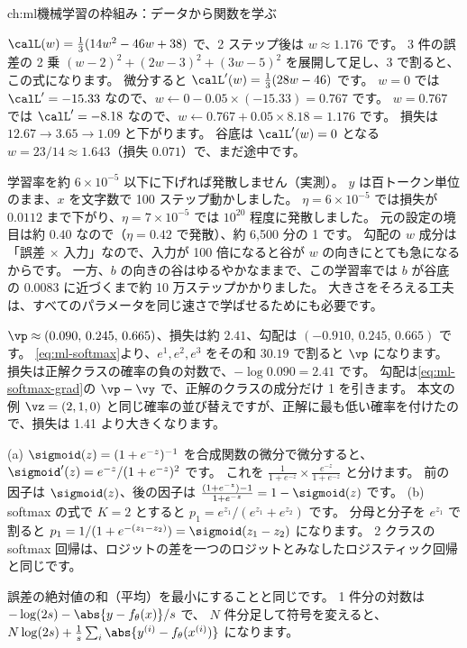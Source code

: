 \begin{answers}{ch:ml}{機械学習の枠組み：データから関数を学ぶ}
\item $\calL(w)=\frac{1}{3}(14w^2-46w+38)$ で、2 ステップ後は $w\approx1.176$ です。
3 件の誤差の 2 乗 $(w-2)^2+(2w-3)^2+(3w-5)^2$ を展開して足し、3 で割ると、この式になります。
微分すると $\calL'(w)=\frac{1}{3}(28w-46)$ です。
$w=0$ では $\calL'=-15.33$ なので、$w\leftarrow0-0.05\times(-15.33)=0.767$ です。
$w=0.767$ では $\calL'=-8.18$ なので、$w\leftarrow0.767+0.05\times8.18=1.176$ です。
損失は $12.67\to3.65\to1.09$ と下がります。
谷底は $\calL'(w)=0$ となる $w=23/14\approx1.643$（損失 $0.071$）で、まだ途中です。
\item 学習率を約 $6\times10^{-5}$ 以下に下げれば発散しません（実測）。
$y$ は百トークン単位のまま、$x$ を文字数で 100 ステップ動かしました。
$\eta=6\times10^{-5}$ では損失が $0.0112$ まで下がり、$\eta=7\times10^{-5}$ では $10^{20}$ 程度に発散しました。
元の設定の境目は約 $0.40$ なので（$\eta=0.42$ で発散）、約 6,500 分の 1 です。
勾配の $w$ 成分は「誤差 $\times$ 入力」なので、入力が 100 倍になると谷が $w$ の向きにとても急になるからです。
一方、$b$ の向きの谷はゆるやかなままで、この学習率では $b$ が谷底の $0.0083$ に近づくまで約 10 万ステップかかりました。
大きさをそろえる工夫は、すべてのパラメータを同じ速さで学ばせるためにも必要です。
\item $\vp\approx(0.090,\,0.245,\,0.665)$、損失は約 $2.41$、勾配は $(-0.910,\,0.245,\,0.665)$ です。
\eqref{eq:ml-softmax}より、$e^1, e^2, e^3$ をその和 $30.19$ で割ると $\vp$ になります。
損失は正解クラスの確率の負の対数で、$-\log0.090=2.41$ です。
勾配は\eqref{eq:ml-softmax-grad}の $\vp-\vy$ で、正解のクラスの成分だけ 1 を引きます。
本文の例 $\vz=(2,1,0)$ と同じ確率の並び替えですが、正解に最も低い確率を付けたので、損失は 1.41 より大きくなります。
\item (a) $\sigmoid(z)=(1+e^{-z})^{-1}$ を合成関数の微分で微分すると、$\sigmoid'(z)=e^{-z}/(1+e^{-z})^2$ です。
これを $\frac{1}{1+e^{-z}}\times\frac{e^{-z}}{1+e^{-z}}$ と分けます。
前の因子は $\sigmoid(z)$、後の因子は $\frac{(1+e^{-z})-1}{1+e^{-z}}=1-\sigmoid(z)$ です。
(b) softmax の式で $K=2$ とすると $p_1=e^{z_1}/(e^{z_1}+e^{z_2})$ です。
分母と分子を $e^{z_1}$ で割ると $p_1=1/(1+e^{-(z_1-z_2)})=\sigmoid(z_1-z_2)$ になります。
2 クラスの softmax 回帰は、ロジットの差を一つのロジットとみなしたロジスティック回帰と同じです。
\item 誤差の絶対値の和（平均）を最小にすることと同じです。
1 件分の対数は $-\log(2s)-\abs{y-f_\theta(x)}/s$ で、
$N$ 件分足して符号を変えると、$N\log(2s)+\frac{1}{s}\sum_i\abs{y^{(i)}-f_\theta(x^{(i)})}$ になります。

\end{answers}
